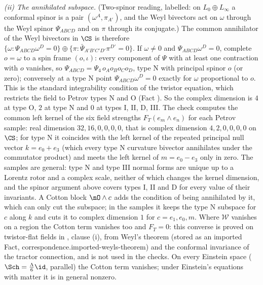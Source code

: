 \emph{(ii) The annihilated subspace.} (Two-spinor reading, labelled: on $L_{0} \oplus L_{\infty}$ a conformal spinor is a pair $(\omega^{A}, \pi_{A'})$, and the Weyl bivectors act on $\omega$ through the Weyl spinor $\Psi_{ABCD}$ and on $\pi$ through its conjugate.) The common annihilator of the Weyl bivectors in $\CS$ is therefore $\{\omega : \Psi_{ABCD}\omega^{D} = 0\} \oplus \{\pi : \bar\Psi_{A'B'C'D'}\pi^{D'} = 0\}$. If $\omega \neq 0$ and $\Psi_{ABCD}\omega^{D} = 0$, complete $o = \omega$ to a spin frame $(o, \iota)$: every component of $\Psi$ with at least one contraction with $o$ vanishes, so $\Psi_{ABCD} = \Psi_{4}\,o_{A}o_{B}o_{C}o_{D}$, type N with principal spinor $o$ (or zero); conversely at a type N point $\Psi_{ABCD}\omega^{D} = 0$ exactly for $\omega$ proportional to $o$. This is the standard integrability condition of the twistor equation, which restricts the field to Petrov types N and O (Fact ). So the complex dimension is $4$ at type O, $2$ at type N and $0$ at types I, II, D, III. The check computes the common left kernel of the six field strengths $F_{T}(e_{m}\wedge e_{n})$ for each Petrov sample: real dimension $32, 16, 0, 0, 0, 0$, that is complex dimension $4, 2, 0, 0, 0, 0$ on $\CS$; for type N it coincides with the left kernel of the repeated principal null vector $k = e_{0} + e_{3}$ (which every type N curvature bivector annihilates under the commutator product) and meets the left kernel of $m = e_{0} - e_{3}$ only in zero. The samples are general: type N and type III normal forms are unique up to a Lorentz rotor and a complex scale, neither of which changes the kernel dimension, and the spinor argument above covers types I, II and D for every value of their invariants. A Cotton block $\nO\wedge c$ adds the condition of being annihilated by it, which can only cut the subspace; in the samples it keeps the type N subspace for $c$ along $k$ and cuts it to complex dimension $1$ for $c = e_{1}, e_{0}, m$. Where $\mathcal{W}$ vanishes on a region the Cotton term vanishes too and $F_{T} = 0$: this converse is proved on twistor-flat fields in , clause (i), from Weyl's theorem (stored as an imported Fact, correspondence.imported-weyls-theorem) and the conformal invariance of the tractor connection, and is not used in the checks. On every Einstein space ($\Sch = \tfrac{\Lambda}{6}\id$, parallel) the Cotton term vanishes; under Einstein's equations with matter it is in general nonzero.

